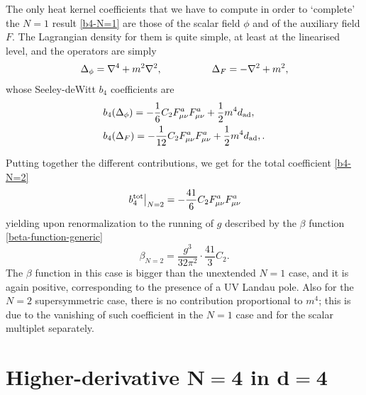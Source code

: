 The only heat kernel coefficients that we have to compute in order to `complete' the $N=1$ result  \eqref{b4-N=1} are those of the scalar field $\phi$ and of the auxiliary field $F$.
The Lagrangian density for them is quite simple, at least at the linearised level, and the operators are simply
\begin{align}
 \Delta_\phi  =  { \mathcal{\nabla} }^4  +  m^2 { \mathcal{\nabla} }^2  ,
\hspace{5em} \Delta_F  =  - { \mathcal{\nabla} }^2  +  m^2  ,
\end{align}
whose Seeley-deWitt $b_4$ coefficients are
\begin{align}
& b_4 (\Delta_\phi) = -\frac{1}{6} C_2 F_{\mu\nu}^a F_{\mu\nu}^a+\frac{1}{2} m^4 d_{ \text{ad} },\\
& b_4 (\Delta_F) = -\frac{1}{12} C_2 F_{\mu\nu}^a F_{\mu\nu}^a + \frac{1}{2} m^4 d_{ \text{ad} },
.
\end{align}


Putting together the different contributions, we get for the total coefficient \eqref{b4-N=2}
\begin{equation}
\left.b_4^{ \text{tot} }\right|_{ N = 2 }
	=
-\frac{41}{6} C_2 F_{\mu\nu}^a F_{\mu\nu}^a
\end{equation}
yielding upon renormalization to the running of $g$ described by the $\beta$ function \eqref{beta-function-generic}
\begin{equation}
\beta_{ N = 2 } = 
\frac{g^3}{32 \pi^2} \cdot \frac{41}{3} C_2.
\end{equation}
The $\beta$ function in this case is bigger than the unextended $N=1$ case, and it is again positive, corresponding to the presence of a UV Landau pole.
Also for the $N=2$ supersymmetric case, there is no contribution proportional to $m^4$; this is due to the vanishing of such coefficient in the $N=1$ case and for the scalar multiplet separately.





\section[Higher-derivative \texorpdfstring{${ N=4}$}{N=4} \sym{} in \texorpdfstring{${ d=4}$}{d=4}]{Higher-derivative \texorpdfstring{$\boldsymbol{ N=4}$}{N=4} \sym{} in \texorpdfstring{$\boldsymbol{ d=4}$}{d=4}}





